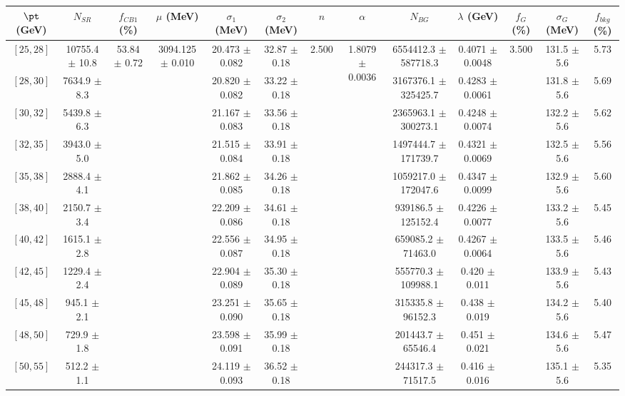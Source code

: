 \begin{tabular}{c||c|c|c|c|c|c|c|c|c|c|c||c}
$\pt$ (GeV) & $N_{SR}$ & $f_{CB1}$ (\%) & $\mu$ (MeV) & $\sigma_1$ (MeV) & $\sigma_2$ (MeV) & $n$ & $\alpha$ & $N_{BG}$ & $\lambda$ (GeV) & $f_G$ (\%) & $\sigma_G$ (MeV) & $f_{bkg}$ (\%) \\
\hline
$[25, 28]$ & 10755.4 $\pm$ 10.8 & \multirow{19}{*}{53.84 $\pm$ 0.72} & \multirow{19}{*}{3094.125 $\pm$ 0.010} & 20.473 $\pm$ 0.082 & 32.87 $\pm$ 0.18 & \multirow{19}{*}{2.500} & \multirow{19}{*}{1.8079 $\pm$ 0.0036} & 6554412.3 $\pm$ 587718.3 & 0.4071 $\pm$ 0.0048 & \multirow{19}{*}{3.500} & 131.5 $\pm$ 5.6 & 5.73\\
$[28, 30]$ & 7634.9 $\pm$ 8.3 &  &  & 20.820 $\pm$ 0.082 & 33.22 $\pm$ 0.18 &  &  & 3167376.1 $\pm$ 325425.7 & 0.4283 $\pm$ 0.0061 &  & 131.8 $\pm$ 5.6 & 5.69\\
$[30, 32]$ & 5439.8 $\pm$ 6.3 &  &  & 21.167 $\pm$ 0.083 & 33.56 $\pm$ 0.18 &  &  & 2365963.1 $\pm$ 300273.1 & 0.4248 $\pm$ 0.0074 &  & 132.2 $\pm$ 5.6 & 5.62\\
$[32, 35]$ & 3943.0 $\pm$ 5.0 &  &  & 21.515 $\pm$ 0.084 & 33.91 $\pm$ 0.18 &  &  & 1497444.7 $\pm$ 171739.7 & 0.4321 $\pm$ 0.0069 &  & 132.5 $\pm$ 5.6 & 5.56\\
$[35, 38]$ & 2888.4 $\pm$ 4.1 &  &  & 21.862 $\pm$ 0.085 & 34.26 $\pm$ 0.18 &  &  & 1059217.0 $\pm$ 172047.6 & 0.4347 $\pm$ 0.0099 &  & 132.9 $\pm$ 5.6 & 5.60\\
$[38, 40]$ & 2150.7 $\pm$ 3.4 &  &  & 22.209 $\pm$ 0.086 & 34.61 $\pm$ 0.18 &  &  & 939186.5 $\pm$ 125152.4 & 0.4226 $\pm$ 0.0077 &  & 133.2 $\pm$ 5.6 & 5.45\\
$[40, 42]$ & 1615.1 $\pm$ 2.8 &  &  & 22.556 $\pm$ 0.087 & 34.95 $\pm$ 0.18 &  &  & 659085.2 $\pm$ 71463.0 & 0.4267 $\pm$ 0.0064 &  & 133.5 $\pm$ 5.6 & 5.46\\
$[42, 45]$ & 1229.4 $\pm$ 2.4 &  &  & 22.904 $\pm$ 0.089 & 35.30 $\pm$ 0.18 &  &  & 555770.3 $\pm$ 109988.1 & 0.420 $\pm$ 0.011 &  & 133.9 $\pm$ 5.6 & 5.43\\
$[45, 48]$ & 945.1 $\pm$ 2.1 &  &  & 23.251 $\pm$ 0.090 & 35.65 $\pm$ 0.18 &  &  & 315335.8 $\pm$ 96152.3 & 0.438 $\pm$ 0.019 &  & 134.2 $\pm$ 5.6 & 5.40\\
$[48, 50]$ & 729.9 $\pm$ 1.8 &  &  & 23.598 $\pm$ 0.091 & 35.99 $\pm$ 0.18 &  &  & 201443.7 $\pm$ 65546.4 & 0.451 $\pm$ 0.021 &  & 134.6 $\pm$ 5.6 & 5.47\\
$[50, 55]$ & 512.2 $\pm$ 1.1 &  &  & 24.119 $\pm$ 0.093 & 36.52 $\pm$ 0.18 &  &  & 244317.3 $\pm$ 71517.5 & 0.416 $\pm$ 0.016 &  & 135.1 $\pm$ 5.6 & 5.35\\

\end{tabular}
